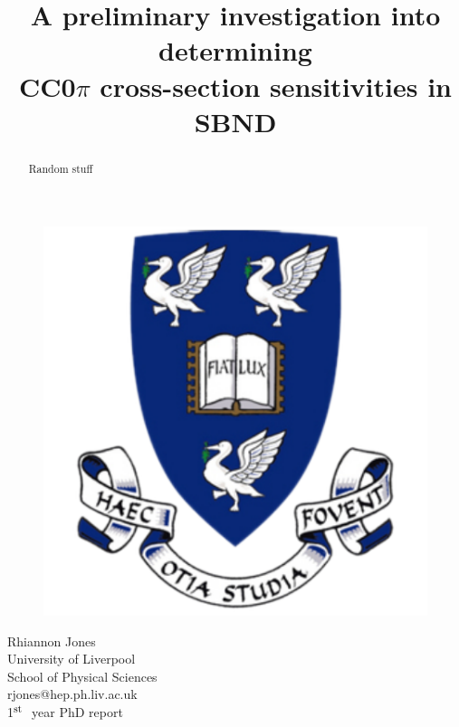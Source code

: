 \documentclass[11pt]{article}
\title{\vspace{5mm}\fontsize{20pt}{12pt}\selectfont A preliminary investigation into determining \\ \vspace{3mm} CC0\(\pi\) cross-section sensitivities in SBND \\ } %
\author{
    \date{}
}
\begin{document}

\maketitle %

\vspace{-9mm}

\begin{figure}[h!]
    \center
    \includegraphics[scale=0.6]{images/UoL_CoA.pdf}
\end{figure}

\vspace{3mm}

\begin{center}

    \large Rhiannon Jones\\
    \normalsize University of Liverpool \\
    \normalsize School of Physical Sciences \\ %
    \normalsize rjones@hep.ph.liv.ac.uk \\ 
    \vspace{3mm}
    \normalsize 1\( ^{ \mbox{\footnotesize st } } \) year PhD report \\

\end{center}

\vspace{6mm}
\begin{abstract}
    Random stuff
\end{abstract}
\newpage
\end{document}
